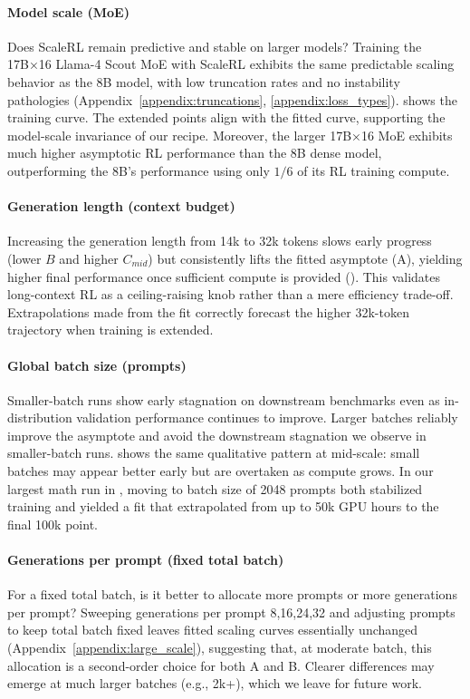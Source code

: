 \documentclass[]{fairmeta} %
\begin{document}
\paragraph{Model scale (MoE)}
Does ScaleRL remain predictive and stable on larger models? Training the 17B×16 Llama-4 Scout MoE with ScaleRL exhibits the same predictable scaling behavior as the 8B model, with low truncation rates and no instability pathologies (Appendix~\ref{appendix:truncations}, \ref{appendix:loss_types}).  shows the training curve. The extended points align with the fitted curve, supporting the model-scale invariance of our recipe. Moreover, the larger 17B×16 MoE exhibits much higher asymptotic RL performance than the 8B dense model, outperforming the 8B's performance using only $1/6$ of its RL training compute.

\paragraph{Generation length (context budget)}
Increasing the generation length from 14k to 32k tokens slows early progress (lower $B$ and higher $C_{mid}$) but consistently lifts the fitted asymptote (A), yielding higher final performance once sufficient compute is provided (). This validates long-context RL as a ceiling-raising knob rather than a mere efficiency trade-off. Extrapolations made from the fit correctly forecast the higher 32k-token trajectory when training is extended. 

\paragraph{Global batch size (prompts)} Smaller-batch runs show early stagnation on downstream benchmarks even as in-distribution validation performance continues to improve. Larger batches reliably improve the asymptote and avoid the downstream stagnation we observe in smaller-batch runs.  shows the same qualitative pattern at mid-scale: small batches may appear better early but are overtaken as compute grows. 
In our largest math run in , moving to batch size of 2048 prompts both stabilized training and yielded a fit that extrapolated from up to 50k GPU hours to the final 100k point.

\paragraph{Generations per prompt (fixed total batch)}
For a fixed total batch, is it better to allocate more prompts or more generations per prompt? Sweeping generations per prompt {8,16,24,32} and adjusting prompts to keep total batch fixed leaves fitted scaling curves essentially unchanged (Appendix~\ref{appendix:large_scale}), suggesting that, at moderate batch, this allocation is a second-order choice for both A and B. Clearer differences may emerge at much larger batches (e.g., 2k+), which we leave for future work. 
\end{document}
